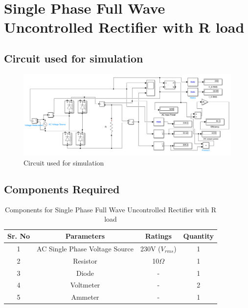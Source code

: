 \section{Single Phase Full Wave Uncontrolled Rectifier
  with R load}

\subsection{Circuit used for simulation}

\begin{figure}[h]
    \centering
    \includegraphics[width=1\textwidth]{images/experiment-2/circuit-diagram-simulation-01.png}
    \caption{Circuit used for simulation}
    \label{Fig_simulation_circuit_single-phase-full-wave-uncontrolled-rectifier-with-R-load}
\end{figure}

\subsection{Components Required}

\begin{table}[h]
    \renewcommand{\arraystretch}{1.3}
    \label{table_components_required_circuit_1}
    \centering
    \begin{tabular}{|c|c|c|c|}
        \hline
        Sr. No & Parameters                     & Ratings            & Quantity \\
        \hline
        \hline
        1      & AC Single Phase Voltage Source & 230V ($ V_{rms} $) & 1        \\
        \hline
        2      & Resistor                       & 10$ \Omega $       & 1        \\
        \hline
        3      & Diode                          & -                  & 1        \\
        \hline
        4      & Voltmeter                      & -                  & 2        \\
        \hline
        5      & Ammeter                        & -                  & 1        \\
        \hline
    \end{tabular}
    \caption{Components for Single Phase Full Wave Uncontrolled Rectifier with R load}

\end{table}




